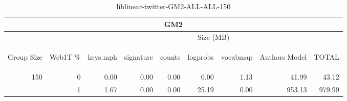 \begin{center}
\begin{table}[htbp] 
 \begin{center}
\begin{tabular}{ | r | r | r | r | r | r | r | r | r |}
\hline
\multicolumn{9}{|c|}{GM2}\\
\hline
 & & \multicolumn{7}{|c|}{Size (MB)}\\ \cline{3-9}
\begin{sideways}Group Size\end{sideways} & \begin{sideways}Web1T \% \end{sideways} & \begin{sideways}keys.mph\end{sideways} & \begin{sideways}signature\end{sideways} & \begin{sideways}counts\end{sideways} & \begin{sideways}logprobs\end{sideways} & \begin{sideways}vocabmap\end{sideways} & \begin{sideways}Authors Model \end{sideways} & \begin{sideways}TOTAL\end{sideways}\\
\hline
\multirow{1}{*}{150}
 & 0 & 0.00 & 0.00 & 0.00 & 0.00 & 1.13 & 41.99 & 43.12\\ \cline{2-9}
 & 1 & 1.67 & 0.00 & 0.00 & 25.19 & 0.00 & 953.13 & 979.99\\ \cline{2-9}
\hline
\end{tabular}
\caption{liblinear-twitter-GM2-ALL-ALL-150}
\label{table:liblinear-twitter-GM2-ALL-ALL-150}
\end{center}
 \end{table}
\end{center}

